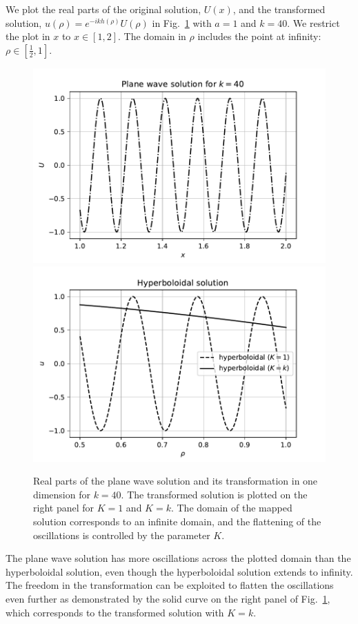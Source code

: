 \documentclass[final,onefignum,onetabnum]{siamart190516}
\begin{document}
We plot the real parts of the original solution, $U(x)$, and the transformed solution, $u(\rho)=e^{-ikh(\rho)}U(\rho)$ in Fig.~\ref{fig:oned} with $a=1$ and $k=40$. We restrict the plot in $x$ to $x\in[1,2]$. The domain in $\rho$ includes the point at infinity: $\rho\in[\tfrac{1}{2},1]$.
\begin{figure}[tbhp]
	\centering
	\includegraphics[scale=0.4]{figs/st_oned}
	\includegraphics[scale=0.4]{figs/hyp_oned.pdf}
	\caption{Real parts of the plane wave solution and its transformation in one dimension for $k=40$. The transformed solution is plotted on the right panel for $K=1$ and $K=k$. The domain of the mapped solution corresponds to an infinite domain, and the flattening of the oscillations is controlled by the parameter $K$.}
	\label{fig:oned}
\end{figure}

The plane wave solution has more oscillations across the plotted domain than the hyperboloidal solution, even though the hyperboloidal solution extends to infinity. The freedom in the transformation can be exploited to flatten the oscillations even further as demonstrated by the solid curve on the right panel of Fig.~\ref{fig:oned}, which corresponds to the transformed solution with $K=k$.
\end{document}
